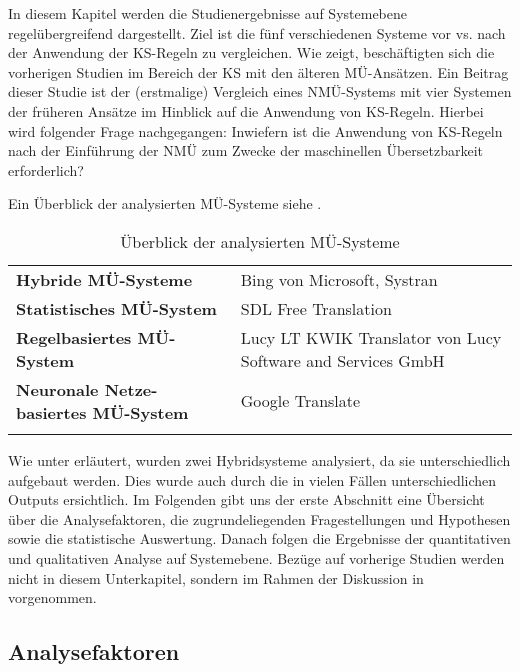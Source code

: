 In diesem Kapitel werden die Studienergebnisse auf Systemebene regelübergreifend dargestellt. Ziel ist die fünf verschiedenen Systeme vor vs. nach der Anwendung der KS-Regeln zu vergleichen. Wie  zeigt, beschäftigten sich die vorherigen Studien im Bereich der KS mit den älteren MÜ-Ansätzen. Ein Beitrag dieser Studie ist der (erstmalige) Vergleich eines NMÜ-Systems mit vier Systemen der früheren Ansätze im Hinblick auf die Anwendung von KS-Regeln. Hierbei wird folgender Frage nachgegangen: Inwiefern ist die Anwendung von KS-Regeln nach der Einführung der NMÜ zum Zwecke der maschinellen Übersetzbarkeit erforderlich?

Ein Überblick der analysierten MÜ-Systeme siehe .


\begin{table}
\begin{tabularx}{\textwidth}{lQ}

\lsptoprule

\textbf{Hybride MÜ-Systeme} & Bing von Microsoft, Systran\\
\tablevspace
\textbf{Statistisches MÜ-System} & SDL Free Translation\\
\tablevspace
\textbf{Regelbasiertes MÜ-System} & Lucy LT KWIK Translator von Lucy Software and Services GmbH\\
\tablevspace
\textbf{Neuronale Netze-basiertes MÜ-System} & Google Translate\\
\lspbottomrule
\end{tabularx}
\caption{\label{tab:05:89}Überblick der analysierten MÜ-Systeme   }
\end{table}

Wie unter  erläutert, wurden zwei Hybridsysteme analysiert, da sie unterschiedlich aufgebaut werden. Dies wurde auch durch die in vielen Fällen unterschiedlichen Outputs ersichtlich. Im Folgenden gibt uns der erste Abschnitt eine Übersicht über die Analysefaktoren, die zugrundeliegenden Fragestellungen und Hypothesen sowie die statistische Auswertung. Danach folgen die Ergebnisse der quantitativen und qualitativen Analyse auf Systemebene. Bezüge auf vorherige Studien werden nicht in diesem Unterkapitel, sondern im Rahmen der Diskussion in  vorgenommen.

\subsection{Analysefaktoren}
\label{sec:5.4.0}

